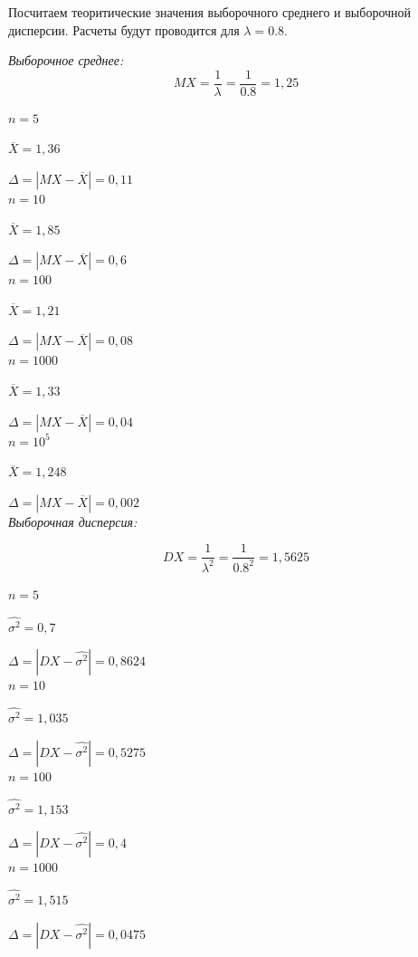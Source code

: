 \documentclass[a4paper,12pt, oneside]{book}
\begin{document}
Посчитаем теоритические значения выборочного среднего и выборочной дисперсии. Расчеты будут проводится для $ \lambda = 0.8 $.

\textit{Выборочное среднее:}
$$
MX = \dfrac{1}{\lambda} = \dfrac{1}{0.8} = 1,25
$$

$n = 5 $

$\overline{X} = 1,36$

$\Delta = |MX - \overline X | = 0,11$\\

$n = 10 $

$\overline{X} = 1,85$

$\Delta = |MX - \overline X | = 0,6$\\

$n = 100 $

$\overline{X} = 1,21$

$\Delta = |MX - \overline X | = 0,08$\\

$n = 1000 $

$\overline{X} = 1,33$

$\Delta = |MX - \overline X | = 0,04$\\

$n = 10^5 $

$\overline{X} = 1,248$

$\Delta = |MX - \overline X | = 0,002$\\

\textit{Выборочная дисперсия:}

$$
DX = \dfrac{1}{\lambda^2} = \dfrac{1}{0.8^2} = 1,5625
$$

$n = 5 $

$\hat{\sigma^2} = 0,7$

$\Delta = |DX - \hat{\sigma^2}| = 0,8624$\\

$n = 10 $

$\hat{\sigma^2} = 1,035$

$\Delta = |DX - \hat{\sigma^2}| = 0,5275$\\

$n = 100 $

$\hat{\sigma^2} = 1,153$

$\Delta = |DX - \hat{\sigma^2}| = 0,4$\\


$n = 1000 $

$\hat{\sigma^2} = 1,515$

$\Delta = |DX - \hat{\sigma^2}| = 0,0475$\\
\end{document}
